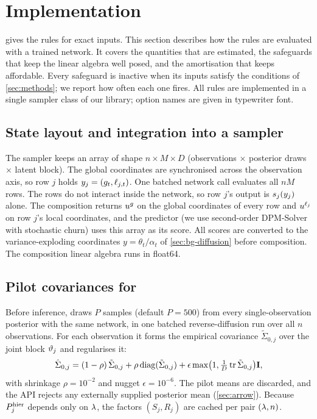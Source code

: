 \section{Implementation}\label{sec:impl}

 gives the rules for exact inputs.
This section describes how the rules are evaluated with a trained network.
It covers the quantities that are estimated, the safeguards that keep the linear algebra well posed, and the amortisation that keeps \quiver{} affordable.
Every safeguard is inactive when its inputs satisfy the conditions of \cref{sec:methods}; we report how often each one fires.
All rules are implemented in a single sampler class of our library; option names are given in typewriter font.

\subsection{State layout and integration into a sampler}\label{sec:impl-layout}

The sampler keeps an array of shape $n\times M\times D$ (observations $\times$ posterior draws $\times$ latent block).
The global coordinates are synchronised across the observation axis, so row $j$ holds $y_j=(g_t,\ell_{j,t})$.
One batched network call evaluates all $nM$ rows.
The rows do not interact inside the network, so row $j$'s output is $s_j(y_j)$ alone.
The composition returns $u^{g}$ on the global coordinates of every row and $u^{\ell_j}$ on row $j$'s local coordinates, and the predictor (we use second-order DPM-Solver \citep{lu2022dpmsolver} with stochastic churn) uses this array as its score.
All scores are converted to the variance-exploding coordinates $y=\theta_t/\alpha_t$ of \cref{sec:bg-diffusion} before composition.
The composition linear algebra runs in float64.

\subsection{Pilot covariances for \arrowm}\label{sec:impl-pilot}

Before inference, \arrowm{} draws $P$ samples (default $P=500$) from every single-observation posterior with the same network, in one batched reverse-diffusion run over all $n$ observations.
For each observation it forms the empirical covariance $\tilde\Sigma_{0,j}$ over the joint block $\vartheta_j$ and regularises it:
\begin{equation}\label{eq:shrinkage}
  \hat\Sigma_{0,j}=(1-\rho)\,\tilde\Sigma_{0,j}+\rho\operatorname{diag}(\tilde\Sigma_{0,j})+\epsilon\max\!\big(1,\tfrac1D\operatorname{tr}\tilde\Sigma_{0,j}\big)\mathbf{I},
\end{equation}
with shrinkage $\rho=10^{-2}$ and nugget $\epsilon=10^{-6}$.
The pilot means are discarded, and the API rejects any externally supplied posterior mean (\cref{sec:arrow}).
Because $P_j^{\mathrm{hier}}$ depends only on $\lambda$, the factors $(S_j,R_j)$ are cached per pair $(\lambda,n)$.

